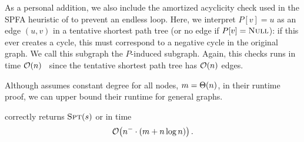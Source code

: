 As a personal addition, we also include the amortized acyclicity check used in the SPFA heuristic of \algbf to prevent an endless loop.
Here, we interpret $P[v] = u$ as an edge $(u,v)$ in a tentative shortest path tree (or no edge if $P[v] = \textsc{Null}$): if this ever creates a cycle, this must correspond to a negative cycle in the original graph.
We call this subgraph the $P$-induced subgraph.
Again, this checks runs in time $\mathcal O\!\left(n\right)$~\cite{toposort} since the tentative shortest path tree has $\mathcal O\!\left(n\right)$ edges.

Although \cite{NegSSSPNearLinear} assumes constant degree for all nodes, \ie $m = \Theta\!\left(n\right)$, in their runtime proof, we can upper bound their runtime for general graphs.
\begin{lemma}\label{lem:runtime_elimneg}
  \algen correctly returns $\textsc{Spt}(s)$ or \negcycle in time \[
    \mathcal O\!\left(n^- \cdot (m + n\log n)\right).
  \]
\end{lemma}
